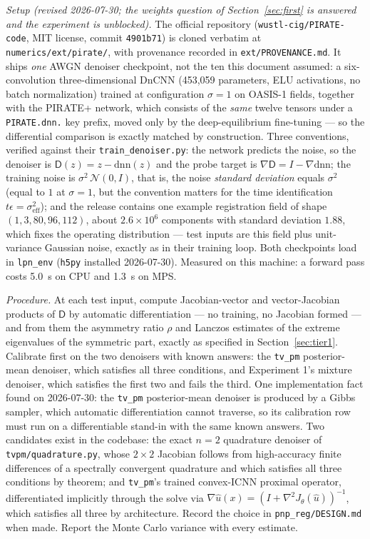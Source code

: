 \documentclass[11pt]{article}
\theoremstyle{definition}
\newcommand{\D}{\mathsf{D}}
\newcommand{\code}[1]{\texttt{#1}}
\begin{document}
\emph{Setup (revised 2026-07-30; the weights question of Section~\ref{sec:first} is answered and the experiment is unblocked).} The official repository (\code{wustl-cig/PIRATE-code}, MIT license, commit \code{4901b71}) is cloned verbatim at \code{numerics/ext/pirate/}, with provenance recorded in \code{ext/PROVENANCE.md}. It ships \emph{one} AWGN denoiser checkpoint, not the ten this document assumed: a six-convolution three-dimensional DnCNN (453{,}059 parameters, ELU activations, no batch normalization) trained at configuration $\sigma = 1$ on OASIS-1 fields, together with the PIRATE+ network, which consists of the \emph{same} twelve tensors under a \code{PIRATE.dnn.} key prefix, moved only by the deep-equilibrium fine-tuning — so the differential comparison is exactly matched by construction. Three conventions, verified against their \code{train\_denoiser.py}: the network predicts the noise, so the denoiser is $\D(z) = z - \mathrm{dnn}(z)$ and the probe target is $\nabla\D = I - \nabla\mathrm{dnn}$; the training noise is $\sigma^2\,\mathcal{N}(0,I)$, that is, the noise \emph{standard deviation} equals $\sigma^2$ (equal to $1$ at $\sigma = 1$, but the convention matters for the time identification $t\epsilon = \sigma_{\mathrm{eff}}^2$); and the release contains one example registration field of shape $(1,3,80,96,112)$, about $2.6\times10^6$ components with standard deviation $1.88$, which fixes the operating distribution — test inputs are this field plus unit-variance Gaussian noise, exactly as in their training loop. Both checkpoints load in \code{lpn\_env} (\code{h5py} installed 2026-07-30). Measured on this machine: a forward pass costs 5.0~s on CPU and 1.3~s on MPS.

\emph{Procedure.} At each test input, compute Jacobian-vector and vector-Jacobian products of $\D$ by automatic differentiation — no training, no Jacobian formed — and from them the asymmetry ratio $\rho$ and Lanczos estimates of the extreme eigenvalues of the symmetric part, exactly as specified in Section~\ref{sec:tier1}. Calibrate first on the two denoisers with known answers: the \code{tv\_pm} posterior-mean denoiser, which satisfies all three conditions, and Experiment 1's mixture denoiser, which satisfies the first two and fails the third. One implementation fact found on 2026-07-30: the \code{tv\_pm} posterior-mean denoiser is produced by a Gibbs sampler, which automatic differentiation cannot traverse, so its calibration row must run on a differentiable stand-in with the same known answers. Two candidates exist in the codebase: the exact $n = 2$ quadrature denoiser of \code{tvpm/quadrature.py}, whose $2\times2$ Jacobian follows from high-accuracy finite differences of a spectrally convergent quadrature and which satisfies all three conditions by theorem; and \code{tv\_pm}'s trained convex-ICNN proximal operator, differentiated implicitly through the solve via $\nabla\hat u(x) = (I + \nabla^2 J_\theta(\hat u))^{-1}$, which satisfies all three by architecture. Record the choice in \code{pnp\_reg/DESIGN.md} when made. Report the Monte Carlo variance with every estimate.
\end{document}
